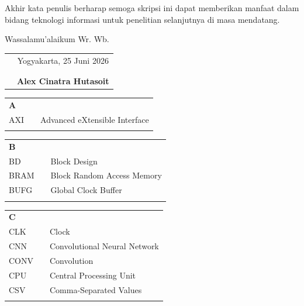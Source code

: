 \documentclass{jtetiskripsi}
\begin{document}
Akhir kata penulis berharap semoga skripsi ini dapat memberikan manfaat dalam bidang teknologi informasi untuk penelitian selanjutnya di masa mendatang.

\vspace{0.5cm}

Wassalamu'alaikum Wr. Wb.

\begin{tabular}{p{7.5cm}c}
&Yogyakarta, 25 Juni 2026\\
&\\
&\\
&\textbf{Alex Cinatra Hutasoit}
\end{tabular}

\tableofcontents
{}
\listoftables
{}
\listoffigures
{}

\singkatan
\noindent

\begin{tabular}{p{20pt}p{3pt}l}
\textbf{A}\\
AXI & & Advanced eXtensible Interface\\
\\
\end{tabular}

\begin{tabular}{p{20pt}p{3pt}l}
\textbf{B}\\
BD & & Block Design\\
BRAM & & Block Random Access Memory\\
BUFG & & Global Clock Buffer\\
\\
\end{tabular}

\begin{tabular}{p{20pt}p{3pt}l}
\textbf{C}\\
CLK & & Clock\\
CNN & & Convolutional Neural Network\\
CONV & & Convolution\\
CPU & & Central Processing Unit\\
CSV & & Comma-Separated Values\\
\\
\end{tabular}
\end{document}
